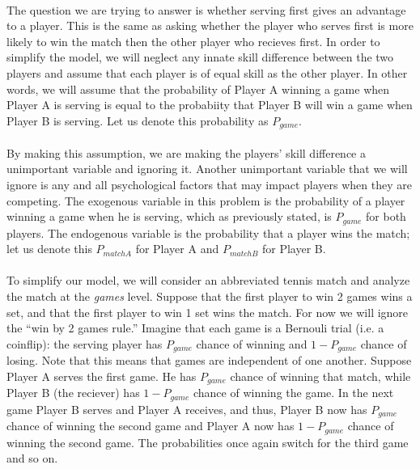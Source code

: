 \documentclass[12pt]{article}
\begin{document}
\paragraph{} The question we are trying to answer is whether serving first gives an advantage to a player. This is the same as asking whether the player who serves first is more likely to win the match then the other player who recieves first. In order to simplify the model, we will neglect any innate skill difference between the two players and assume that each player is of equal skill as the other player. In other words, we will assume that the probability of Player A winning a game when Player A is serving is equal to the probabiity that Player B will win a game when Player B is serving. Let us denote this probability as $P_{game}$.

\paragraph{} By making this assumption, we are making the players' skill difference a unimportant variable and ignoring it. Another unimportant variable that we will ignore is any and all psychological factors that may impact players when they are competing. The exogenous variable in this problem is the probability of a player winning a game when he is serving, which as previously stated, is $P_{game}$ for both players. The endogenous variable is the probability that a player wins the match; let us denote this $P_{matchA}$ for Player A and $P_{matchB}$ for Player B.

\paragraph{} To simplify our model, we will consider an abbreviated tennis match and analyze the match at the \emph{games} level. Suppose that the first player to win 2 games wins a set, and that the first player to win 1 set wins the match. For now we will ignore the ``win by 2 games rule.'' Imagine that each game is a Bernouli trial (i.e. a coinflip): the serving player has $P_{game}$ chance of winning and $1-P_{game}$ chance of losing. Note that this means that games are independent of one another. Suppose Player A serves the first game. He has $P_{game}$ chance of winning that match, while Player B (the reciever) has $1-P_{game}$ chance of winning the game. In the next game Player B serves and Player A receives, and thus, Player B now has $P_{game}$ chance of winning the second game and Player A now has $1-P_{game}$ chance of winning the second game. The probabilities once again switch for the third game and so on.
\end{document}
